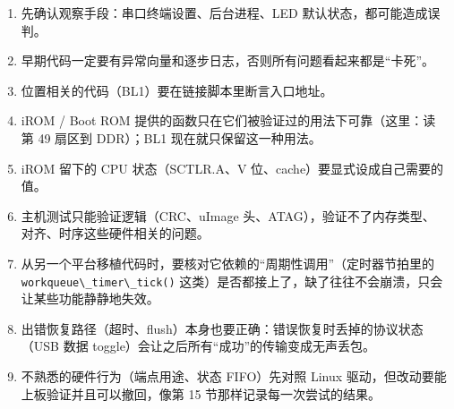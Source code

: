 \begin{enumerate}
\def\labelenumi{\arabic{enumi}.}
\tightlist
\item
  先确认观察手段：串口终端设置、后台进程、LED 默认状态，都可能造成误判。
\item
  早期代码一定要有异常向量和逐步日志，否则所有问题看起来都是``卡死''。
\item
  位置相关的代码（BL1）要在链接脚本里断言入口地址。
\item
  iROM / Boot ROM 提供的函数只在它们被验证过的用法下可靠（这里：读 第 49
  扇区到 DDR）；BL1 现在就只保留这一种用法。
\item
  iROM 留下的 CPU 状态（SCTLR.A、V 位、cache）要显式设成自己需要的值。
\item
  主机测试只能验证逻辑（CRC、uImage 头、ATAG），验证不了内存类型、
  对齐、时序这些硬件相关的问题。
\item
  从另一个平台移植代码时，要核对它依赖的``周期性调用''（定时器节拍里的
  \passthrough{\lstinline!workqueue\_timer\_tick()!}
  这类）是否都接上了，缺了往往不会崩溃，只会 让某些功能静静地失效。
\item
  出错恢复路径（超时、flush）本身也要正确：错误恢复时丢掉的协议状态
  （USB 数据 toggle）会让之后所有``成功''的传输变成无声丢包。
\item
  不熟悉的硬件行为（端点用途、状态 FIFO）先对照 Linux 驱动，但改动要能
  上板验证并且可以撤回，像第 15 节那样记录每一次尝试的结果。
\end{enumerate}
